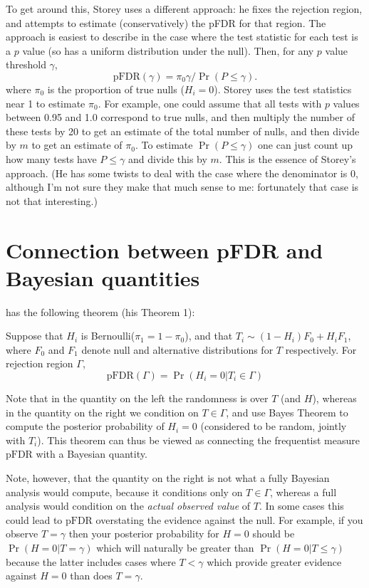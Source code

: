 \documentclass[times,11pt]{article}
\def\pFDR{\text{pFDR}}
\begin{document}
To get around this, Storey uses a different approach: he fixes the rejection region, and attempts to estimate
(conservatively) the pFDR for that region. The approach is easiest to describe in the case where the test statistic for each test is a $p$ value (so has a uniform distribution under the null).
Then, for any $p$ value threshold $\gamma$, 
\begin{equation}
\pFDR(\gamma) = \pi_0 \gamma/ \Pr(P \leq \gamma).
\end{equation}
where $\pi_0$ is the proportion of true nulls ($H_i=0$).
Storey uses the test statistics near 1 to estimate $\pi_0$. For example, one could assume that all tests with $p$ values between 0.95 and 1.0 correspond to true nulls, and then multiply the number of these tests by 20 to get an estimate of the total number of nulls, and then divide by $m$ to get an estimate of $\pi_0$. To estimate $\Pr(P \leq \gamma)$ one can just count up how many tests have $P \leq \gamma$ and divide this by $m$. This is the essence of Storey's approach. (He has some twists to deal with the case where the denominator is 0, although I'm not sure they make that much sense to me: fortunately that case is not that interesting.)

\section{Connection between pFDR and Bayesian quantities}

\cite{storey.03} has the following theorem (his Theorem 1):

Suppose that $H_i$ is Bernoulli($\pi_1=1-\pi_0$),
and that $T_i \sim (1-H_i) F_0 + H_i F_1$, where $F_0$ and $F_1$ denote null and alternative distributions for $T$ respectively.  For rejection region $\Gamma$,
\begin{equation}
\pFDR(\Gamma) = \Pr(H_i=0 | T_i \in \Gamma)
\end{equation}

Note that in the quantity on the left the randomness is over $T$ (and $H$), whereas in the quantity on the right we condition on $T \in \Gamma$, and use Bayes Theorem to compute the posterior probability of $H_i=0$ (considered to be random, jointly with $T_i$). This theorem can thus
be viewed as connecting the frequentist measure $\pFDR$ with a Bayesian quantity. 

Note, however, that the quantity on the right is not what a fully Bayesian analysis would compute, because it conditions only on $T \in \Gamma$, whereas a full analysis would condition on the {\it actual observed value} of $T$. In some cases this could lead to $\pFDR$ overstating the evidence against the null. For example, if you observe $T=\gamma$ then your
posterior probability for $H=0$ should be $\Pr(H=0 | T=\gamma)$ which will naturally be greater than $\Pr(H=0 | T \leq \gamma)$ because the latter includes cases where $T<\gamma$ which provide greater evidence against $H=0$ than does $T=\gamma$.
\end{document}
